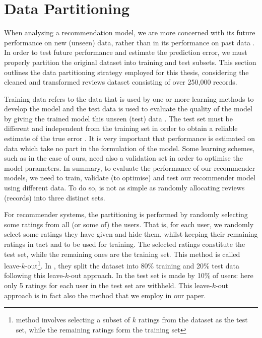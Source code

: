 \section{Data Partitioning}
\label{sec:3 Data Partitioning}

When analysing a recommendation model, we are more concerned with its future performance on new (unseen) data, rather than in its performance on past data \cite{witten2005practical}. In order to test future performance and estimate the prediction error, we must properly partition the original dataset into training and test subsets. This section outlines the data partitioning strategy employed for this thesis, considering the cleaned and transformed reviews dataset consisting of over 250,000 records. 

Training data refers to the data that is used by one or more learning methods to develop the model and the test data is used to evaluate the quality of the model by giving the trained model this unseen (test) data \cite{witten2005practical}. The test set must be different and independent from the training set in order to obtain a reliable estimate of the true error \cite{witten2005practical}. It is very important that performance is estimated on data which take no part in the formulation of the model. Some learning schemes, such as in the case of ours, need also a validation set in order to optimise the model parameters. In summary, to evaluate the performance of our recommender models, we need to train, validate (to optimise) and test our recommender model using different data. To do so, is not as simple as randomly allocating reviews (records) into three distinct sets. 

For recommender systems, the partitioning is performed by randomly selecting some ratings from all (or some of) the users. That is, for each user, we randomly select some ratings they have given and hide them, whilst keeping their remaining ratings in tact and to be used for training. The selected ratings constitute the test set, while the remaining ones are the training set. This method is called leave-$k$-out\footnote{method involves selecting a subset of $k$ ratings from the dataset as the test set, while the remaining ratings form the training set}. In \cite{sarwar2002incremental}, they split the dataset into 80\% training and 20\% test data following this leave-$k$-out approach. In \cite{herlocker1999algorithmic} the test set is made by 10\% of users: here only 5 ratings for each user in the test set are withheld. This leave-$k$-out approach is in fact also the method that we employ in our paper. 

